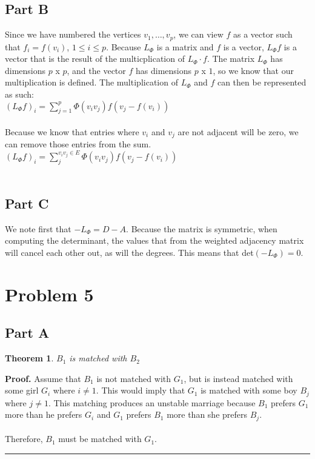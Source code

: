 \documentclass{article}%
\newtheorem{theorem}{Theorem}
\newenvironment{proof}[1][Proof]{\noindent\textbf{#1.} }{\ \rule{0.5em}{0.5em}}
\begin{document}
\subsection{Part B}
Since we have numbered the vertices $v_1, \ldots, v_p$, we can view $f$ as a vector such that $f_i = f(v_i)$, $1 \leq i \leq p$. Because $L_\Phi$ is a matrix and $f$ is a vector, $L_\Phi f$ is a vector that is the result of the multicplication of $L_\Phi \cdot f$. The matrix $L_\Phi$ has dimensions $p$ x $p$, and the vector $f$ has dimensions $p$ x $1$, so we know that our multiplication is defined. The multiplication of $L_\Phi$ and $f$ can then be represented as such: \\

$(L_\Phi f)_{i} = \sum\limits_{j=1}^{p}\Phi(v_iv_j)f(v_j - f(v_i))$ \\ \\
Because we know that entries where $v_i$ and $v_j$ are not adjacent will be zero, we can remove those entries from the sum.\\

$(L_\Phi f)_{i} = \sum\limits_{j}^{v_iv_j \in E}\Phi(v_iv_j)f(v_j - f(v_i))$ \\ \\

\subsection{Part C}
We note first that $-L_\Phi = D - A$. Because the matrix is symmetric, when computing the determinant, the values that from the weighted adjacency matrix will cancel each other out, as will the degrees. This means that det$(-L_\Phi) = 0$.

\section{Problem 5}
\subsection{Part A}
\begin{theorem}
$B_1$ is matched with $B_2$
\end{theorem}

\begin{proof}
    Assume that $B_1$ is not matched with $G_1$, but is instead matched with some girl $G_i$ where $i \neq 1$. This would imply that $G_1$ is matched with some boy $B_j$ where $j \neq 1$. This matching produces an unstable marriage because $B_1$ prefers $G_1$ more than he prefers $G_i$ and $G_1$ prefers $B_1$ more than she prefers $B_j$. \\ \\
    Therefore, $B_1$ must be matched with $G_1$.
\end{proof}
\end{document}
